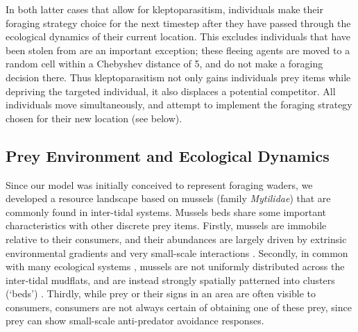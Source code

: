 \documentclass[11pt]{article}
\begin{document}
In both latter cases that allow for kleptoparasitism, individuals make their foraging strategy choice for the next timestep after they have passed through the ecological dynamics of their current location.
This excludes individuals that have been stolen from are an important exception; these fleeing agents are moved to a random cell within a Chebyshev distance of 5, and do not make a foraging decision there.
Thus kleptoparasitism not only gains individuals prey items while depriving the targeted individual, it also displaces a potential competitor.
All individuals move simultaneously, and attempt to implement the foraging strategy chosen for their new location (see below).

\subsection*{Prey Environment and Ecological Dynamics}

Since our model was initially conceived to represent foraging waders, we developed a resource landscape based on mussels (family \textit{Mytilidae}) that are commonly found in inter-tidal systems.
Mussels beds share some important characteristics with other discrete prey items.
Firstly, mussels are immobile relative to their consumers, and their abundances are largely driven by extrinsic environmental gradients and very small-scale interactions \citep{dejager2020, dejager2011}.
Secondly, in common with many ecological systems \citep{levin1992}, mussels are not uniformly distributed across the inter-tidal mudflats, and are instead strongly spatially patterned into clusters (`beds') \citep{dejager2020, dejager2011}.
Thirdly, while prey or their signs in an area are often visible to consumers, consumers are not always certain of obtaining one of these prey, since prey can show small-scale anti-predator avoidance responses.
\end{document}

